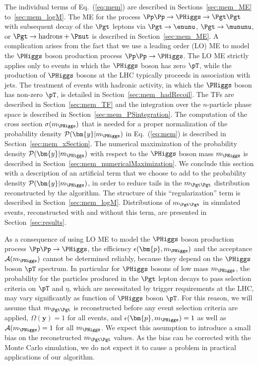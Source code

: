 The individual terms of Eq.~(\ref{eq:mem}) are described in
Sections~\ref{sec:mem_ME} to~\ref{sec:mem_logM}.
The ME for the process $\Pp\Pp \to \PHiggs \to \Pgt\Pgt$
with subsequent decay of the $\Pgt$ leptons 
via $\Pgt \to \enunu$, $\Pgt \to \mununu$, or $\Pgt \to \textrm{hadrons} + \Pnut$
is described in Section~\ref{sec:mem_ME}.
A complication arises from the fact that we use a leading order (LO)
ME to model the $\PHiggs$ boson production process $\Pp\Pp \to
\PHiggs$. The LO ME strictly applies only to events in which the $\PHiggs$ boson has zero $\pT$,
while the production of $\PHiggs$ bosons at the LHC typically
proceeds in association with jets.
The treatment of events with hadronic activity, in which the $\PHiggs$ boson has non-zero $\pT$,
is detailed in Section~\ref{sec:mem_hadRecoil}.
The TFs are described in Section~\ref{sec:mem_TF} and
the integration over the $n$-particle phase space is described in
Section~\ref{sec:mem_PSintegration}.
The computation of the cross section $\sigma(m_{\PHiggs})$ that is needed for a proper normalization of the probability density $\mathcal{P}(\bm{y}|m_{\PHiggs})$
in Eq.~(\ref{eq:mem}) is described in Section~\ref{sec:mem_xSection}.
The numerical maximization of the probability density $\mathcal{P}(\bm{y}|m_{\PHiggs})$
with respect to the $\PHiggs$ boson mass $m_{\PHiggs}$ is described in
Section~\ref{sec:mem_numericalMaximization}.
We conclude this section with a description of an artificial term that we
choose to add to the probability density $\mathcal{P}(\bm{y}|m_{\PHiggs})$, in
order to reduce tails in the $m_{\Pgt\Pgt}$ distribution reconstructed
by the algorithm. The structure of this ``regularization'' term is described in
Section~\ref{sec:mem_logM}.
Distributions of $m_{\Pgt\Pgt}$ in simulated events,
reconstructed with and without this term, are presented in Section~\ref{sec:results}.

As a consequence of using LO ME to model the $\PHiggs$ boson production process $\Pp\Pp \to \PHiggs$,
the efficiency $\epsilon(\bm{p},m_{\PHiggs})$ and the acceptance $\mathcal{A}(m_{\PHiggs})$ cannot be determined reliably,
because they depend on the $\PHiggs$ boson $\pT$ spectrum.
In particular for $\PHiggs$ bosons of low mass $m_{\PHiggs}$,
the probability for the particles produced in the $\Pgt$ lepton decays to pass selection criteria on $\pT$ and $\eta$, 
which are necessitated by trigger requirements at the LHC,
may vary significantly as function of $\PHiggs$ boson $\pT$.
For this reason, we will assume that $m_{\Pgt\Pgt}$ is reconstructed before any event selection criteria are applied,
\ie $\Omega(\bm{y}) = 1$ for all events,
and $\epsilon(\bm{p},m_{\PHiggs}) = 1$ as well as $\mathcal{A}(m_{\PHiggs}) = 1$ for all $m_{\PHiggs}$.
We expect this assumption to introduce a small bias on the reconstructed $m_{\Pgt\Pgt}$ values.
As the bias can be corrected with the Monte Carlo simulation,
we do not expect it to cause a problem in practical applications of our algorithm.




